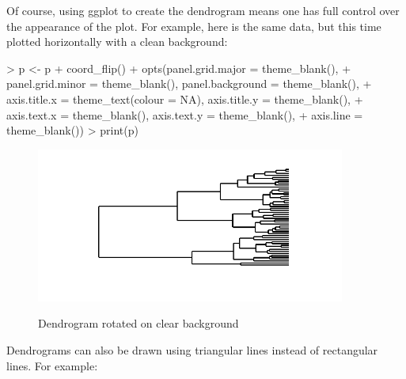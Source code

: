 \documentclass[a4paper]{article}
\begin{document}
Of course, using ggplot to create the dendrogram means one has full control over the appearance of the plot.  For example, here is the same data, but this time plotted horizontally with a clean background:

\begin{Schunk}
\begin{Sinput}
> p <- p + coord_flip() + opts(panel.grid.major = theme_blank(), 
+     panel.grid.minor = theme_blank(), panel.background = theme_blank(), 
+     axis.title.x = theme_text(colour = NA), axis.title.y = theme_blank(), 
+     axis.text.x = theme_blank(), axis.text.y = theme_blank(), 
+     axis.line = theme_blank())
> print(p)
\end{Sinput}
\end{Schunk}

\begin{figure}[h]
\begin{center}
{
\includegraphics[width=4in, height=2in]{ggdendro-dendro2}
}
\end{center}
\caption{Dendrogram rotated on clear background}
\end{figure}

Dendrograms can also be drawn using triangular lines instead of rectangular lines.  For example:

\begin{Schunk}
\end{Schunk}
\end{document}

